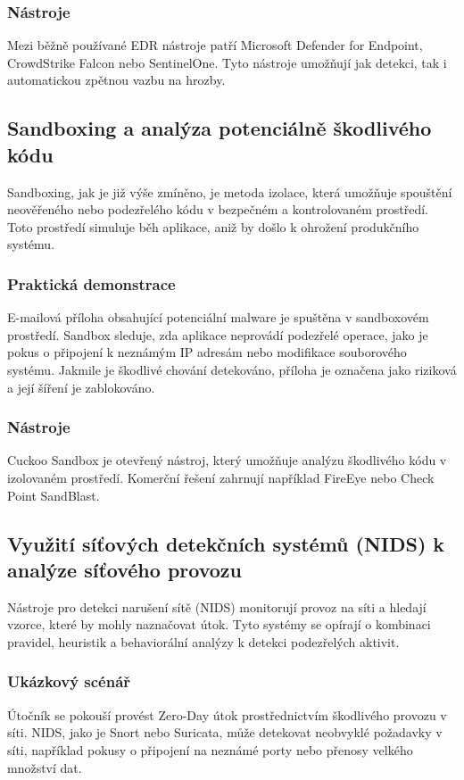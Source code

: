 \documentclass[11pt, conference, a4paper]{IEEEtran}
\begin{document}
\subsubsection{Nástroje} Mezi běžně používané EDR nástroje patří Microsoft Defender for Endpoint, CrowdStrike Falcon nebo SentinelOne. Tyto nástroje umožňují jak detekci, tak i automatickou zp\v etnou vazbu na hrozby.
\subsection{Sandboxing a analýza potenciálně škodlivého kódu}
Sandboxing, jak je již výše zmíněno, je metoda izolace, která umožňuje spouštění neověřeného nebo podezřelého kódu v bezpečném a kontrolovaném prostředí. Toto prostředí simuluje běh aplikace, aniž by došlo k ohrožení produkčního systému.

\subsubsection{Praktická demonstrace} E-mailová příloha obsahující potenciální malware je spuštěna v sandboxovém prostředí. Sandbox sleduje, zda aplikace neprovádí podezřelé operace, jako je pokus o připojení k neznámým IP adresám nebo modifikace souborového systému. Jakmile je škodlivé chování detekováno, příloha je označena jako riziková a její šíření je zablokováno.
\subsubsection{Nástroje} Cuckoo Sandbox je otevřený nástroj, který umožňuje analýzu škodlivého kódu v izolovaném prostředí. Komerční řešení zahrnují například FireEye nebo Check Point SandBlast.
\subsection{Využití síťových detekčních systémů (NIDS) k analýze síťového provozu \cite{Miller}}
Nástroje pro detekci narušení sítě (NIDS) monitorují provoz na síti a hledají vzorce, které by mohly naznačovat útok. Tyto systémy se opírají o kombinaci pravidel, heuristik a behaviorální analýzy k detekci podezřelých aktivit.

\subsubsection{Ukázkový scénář }Útočník se pokouší provést Zero-Day útok prostřednictvím škodlivého provozu v síti. NIDS, jako je Snort nebo Suricata, může detekovat neobvyklé požadavky v síti, například pokusy o připojení na neznámé porty nebo přenosy velkého množství dat.
\end{document}
